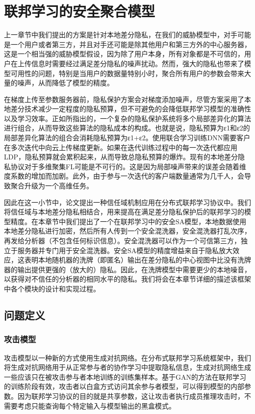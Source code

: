 \chapter{联邦学习的安全聚合模型}
\label{ch4}

上一章节中我们提出的方案是针对本地差分隐私，在我们的威胁模型中，对手可能是一个用户或者第三方，并且对手还可能是除其他用户和第三方外的中心服务器，这是一个相当强的威胁模型假设，因为除了用户本身，所有对象都是不可信的，用户在上传信息时需要经过满足差分隐私的噪声扰动。然而，强大的隐私也带来了模型可用性的问题，特别是当用户的数据量特别小时，聚合所有用户的参数会带来大量的噪声，从而降低了模型的精度。

在梯度上传至参数服务器前，隐私保护方案会对梯度添加噪声，尽管方案采用了本地差分技术减少一定程度的隐私预算，但不可避免的会降低联邦学习模型的准确性以及学习效率。正如\cite{ref37}所指出的，一个复杂的隐私保护系统将多个局部差异化的算法进行组合，从而导致这些算法的隐私成本的构成。也就是说，隐私预算为ε1和ε2的局部差异化算法的组合会消耗隐私预算为ε1+ε2。使用联合学习训练DNN需要客户在多次迭代中向云上传梯度更新。如果在迭代训练过程中的每一次迭代都应用 LDP，隐私预算就会累积起来，从而导致总隐私预算的爆炸。现有的本地差分隐私协议对于多维聚集FL可能是不可行的。这是因为局部噪声带来的误差会随着维度系数的增加而加剧\cite{ref38}。此外，由于参与一次迭代的客户端数量通常为几千人，会导致聚合升级为一个高维任务。

因此在这一小节中，论文提出一种信任域机制应用在分布式联邦学习协议中。我们将信任域与本地差分隐私相结合，用来提高在满足差分隐私保护后的联邦学习的模型精度。在本章节中我们提出了一个在联邦学习中的安全SA模型，本地数据使用本地差分隐私进行加密，然后所有人传到一个安全混洗器，安全混洗器打乱次序，再发给分析器（不包含任何标识信息）。安全混洗器可以作为一个可信第三方，独立于服务器并专门用于安全混洗器。安全SA模型的精度增益来自于隐私放大效应\cite{ref39}，这表明本地随机器的洗牌（即匿名）输出在差分隐私的中心视图中比没有洗牌器的输出提供更强的（放大的）隐私。因此，在洗牌模型中需要更少的本地噪音，以获得对不信任的分析器的相同水平的隐私。我们将会在本章节详细的描述该框架中各个模块的设计和实现过程。


\section{问题定义}
\subsection{攻击模型}
攻击模型以一种新的方式使用生成对抗网络。在分布式联邦学习系统框架中，我们将生成对抗网络用于从正常参与者的协作学习中提取隐私信息，生成对抗网络生成一些应该只在被攻击参与者本地训练的训练集样本。基于GAN的方法在联邦学习的训练阶段有效，攻击者以白盒方式访问其余参与者模型，可以得到模型的内部参数。因为联邦学习协议的目的就是共享参数，这让攻击者执行成员推理攻击时，不需要考虑只能查询每个特定输入与模型输出的黑盒模式。 


